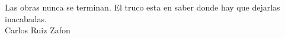 Las obras nunca se terminan. El truco esta en saber donde hay que dejarlas inacabadas. \\
Carlos Ruiz Zafon